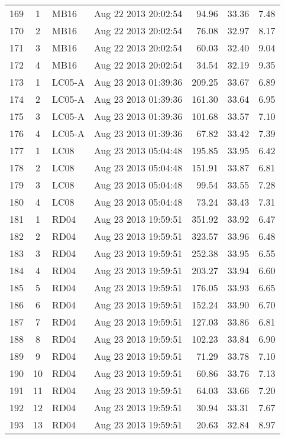 \documentclass{article}
\begin{document}
\begin{longtable}{ccllrrr}
\hline
169 & 1 & MB16 & Aug 22 2013 20:02:54 & 94.96 & 33.36 & 7.48 \\
170 & 2 & MB16 & Aug 22 2013 20:02:54 & 76.08 & 32.97 & 8.17 \\
171 & 3 & MB16 & Aug 22 2013 20:02:54 & 60.03 & 32.40 & 9.04 \\
172 & 4 & MB16 & Aug 22 2013 20:02:54 & 34.54 & 32.19 & 9.35 \\
\hline
173 & 1 & LC05-A & Aug 23 2013 01:39:36 & 209.25 & 33.67 & 6.89 \\
174 & 2 & LC05-A & Aug 23 2013 01:39:36 & 161.30 & 33.64 & 6.95 \\
175 & 3 & LC05-A & Aug 23 2013 01:39:36 & 101.68 & 33.57 & 7.10 \\
176 & 4 & LC05-A & Aug 23 2013 01:39:36 & 67.82 & 33.42 & 7.39 \\
\hline
177 & 1 & LC08 & Aug 23 2013 05:04:48 & 195.85 & 33.95 & 6.42 \\
178 & 2 & LC08 & Aug 23 2013 05:04:48 & 151.91 & 33.87 & 6.81 \\
179 & 3 & LC08 & Aug 23 2013 05:04:48 & 99.54 & 33.55 & 7.28 \\
180 & 4 & LC08 & Aug 23 2013 05:04:48 & 73.24 & 33.43 & 7.31 \\
\hline
181 & 1 & RD04 & Aug 23 2013 19:59:51 & 351.92 & 33.92 & 6.47 \\
182 & 2 & RD04 & Aug 23 2013 19:59:51 & 323.57 & 33.96 & 6.48 \\
183 & 3 & RD04 & Aug 23 2013 19:59:51 & 252.38 & 33.95 & 6.55 \\
184 & 4 & RD04 & Aug 23 2013 19:59:51 & 203.27 & 33.94 & 6.60 \\
185 & 5 & RD04 & Aug 23 2013 19:59:51 & 176.05 & 33.93 & 6.65 \\
186 & 6 & RD04 & Aug 23 2013 19:59:51 & 152.24 & 33.90 & 6.70 \\
187 & 7 & RD04 & Aug 23 2013 19:59:51 & 127.03 & 33.86 & 6.81 \\
188 & 8 & RD04 & Aug 23 2013 19:59:51 & 102.23 & 33.84 & 6.90 \\
189 & 9 & RD04 & Aug 23 2013 19:59:51 & 71.29 & 33.78 & 7.10 \\
190 & 10 & RD04 & Aug 23 2013 19:59:51 & 60.86 & 33.76 & 7.13 \\
191 & 11 & RD04 & Aug 23 2013 19:59:51 & 64.03 & 33.66 & 7.20 \\
192 & 12 & RD04 & Aug 23 2013 19:59:51 & 30.94 & 33.31 & 7.67 \\
193 & 13 & RD04 & Aug 23 2013 19:59:51 & 20.63 & 32.84 & 8.97 \\

\end{longtable}
\end{document}
